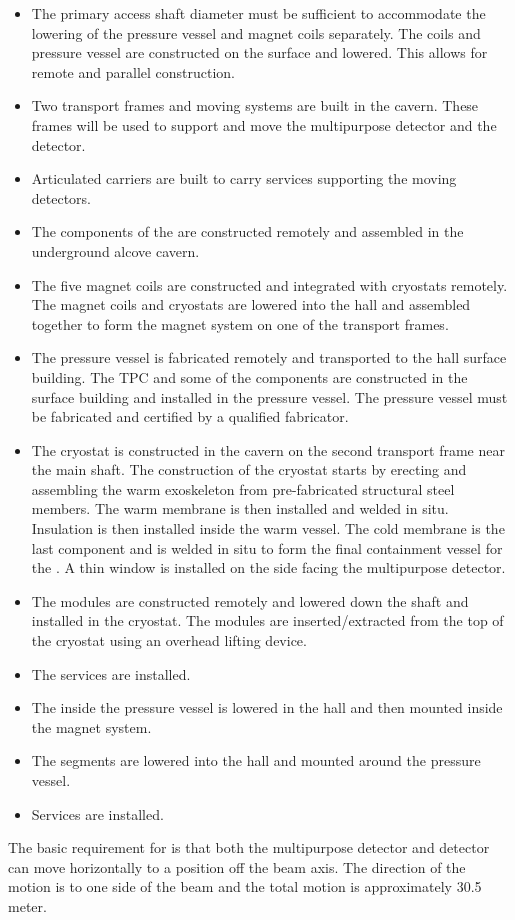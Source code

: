 \begin{itemize}
    \item The primary access shaft diameter must be sufficient to  accommodate the lowering of the pressure vessel and magnet coils separately. The coils and pressure vessel are constructed on the surface and lowered. This allows for remote and parallel construction.
    \item Two transport frames and moving systems are built in the cavern.  These frames will be used to support and move the multipurpose detector and the  detector.
    \item Articulated carriers are built to carry services supporting the moving detectors.
    \item The components of the  are constructed remotely and assembled in the underground alcove cavern.  
    \item The five magnet coils are constructed and integrated with cryostats remotely.  The magnet coils and cryostats are lowered into the   hall and assembled together to form the magnet system on one of the transport frames.
    \item The pressure vessel is fabricated remotely and transported to the   hall surface building.  The TPC and some of the  components are constructed in the surface building and installed in the pressure vessel.  The pressure vessel must be fabricated and certified by a qualified fabricator.
    \item The  cryostat is constructed in the cavern on the second transport frame near the main shaft.  The construction of the cryostat starts by erecting and assembling the warm exoskeleton from pre-fabricated structural steel members. The warm membrane is then installed and welded in situ. Insulation is then installed inside the warm vessel. The cold membrane is the last component and is welded in situ to form the final containment vessel for the . A thin window is installed on the side facing the multipurpose detector. 
    \item The  modules are constructed remotely and lowered down the shaft and installed in the cryostat. The modules are inserted/extracted from the  top of the cryostat using an overhead lifting device. 
    \item The  services are installed.
    \item The  inside the pressure vessel is lowered in the hall and then mounted inside the magnet system. 
    \item The  segments are lowered into the hall and mounted around the pressure vessel. 
    \item  Services are installed.
\end{itemize}
The basic requirement for  is that both the multipurpose detector and  detector can move horizontally to a position off the beam axis. The direction of the motion is to one side of the beam and the total motion is approximately 30.5 meter. 

